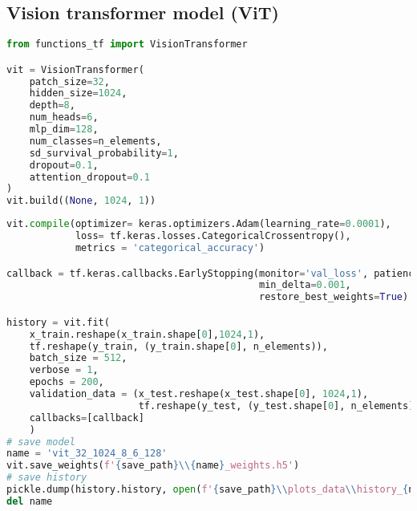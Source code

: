 \hypertarget{vision-transformer-model-vit}{%
\subsection*{Vision transformer model
(ViT)}\label{vision-transformer-model-vit}}

\begin{lstlisting}[language=Python]
from functions_tf import VisionTransformer

vit = VisionTransformer(
    patch_size=32,
    hidden_size=1024,
    depth=8,
    num_heads=6,
    mlp_dim=128,
    num_classes=n_elements,
    sd_survival_probability=1,
    dropout=0.1,
    attention_dropout=0.1
)
vit.build((None, 1024, 1))
\end{lstlisting}

\begin{lstlisting}[language=Python]
vit.compile(optimizer= keras.optimizers.Adam(learning_rate=0.0001),
            loss= tf.keras.losses.CategoricalCrossentropy(),
            metrics = 'categorical_accuracy')

callback = tf.keras.callbacks.EarlyStopping(monitor='val_loss', patience=10,
                                            min_delta=0.001,
                                            restore_best_weights=True)

history = vit.fit(
    x_train.reshape(x_train.shape[0],1024,1),
    tf.reshape(y_train, (y_train.shape[0], n_elements)),
    batch_size = 512,
    verbose = 1,
    epochs = 200,
    validation_data = (x_test.reshape(x_test.shape[0], 1024,1),
                       tf.reshape(y_test, (y_test.shape[0], n_elements))),
    callbacks=[callback]
    )
# save model
name = 'vit_32_1024_8_6_128'
vit.save_weights(f'{save_path}\\{name}_weights.h5')
# save history
pickle.dump(history.history, open(f'{save_path}\\plots_data\\history_{name}.pkl', 'wb'))
del name
\end{lstlisting}